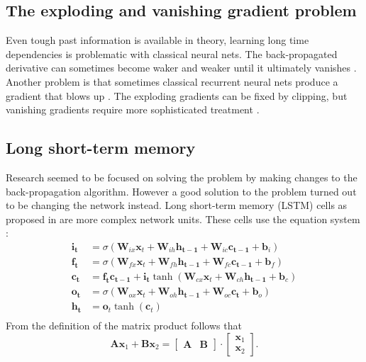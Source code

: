 \subsection{The exploding and vanishing gradient problem}
Even tough past information is available in theory, learning long time dependencies is problematic with classical neural nets. The back-propagated derivative can sometimes become waker and weaker until it ultimately vanishes \cite{Hochreiter1998}. Another problem is that sometimes classical recurrent neural nets produce a gradient that blows up \cite{Pascanu2012}. The exploding gradients can be fixed by clipping, but vanishing gradients require more sophisticated treatment \cite{Bengio1993}.     

\subsection{Long short-term memory}
Research seemed to be focused on solving the problem by making changes to the back-propagation algorithm. However a good solution to the problem turned out to
be changing the network instead. Long short-term memory (LSTM) cells as proposed in \cite{Hochreiter1995} are more complex network units.
These cells use the equation system \cite[page 5]{Graves2013}:
\begin{align}
\mathbf{i_t} &= \sigma (\mathbf{W}_{ix} \mathbf{x}_t + \mathbf{W}_{ih} \mathbf{h_{t-1}} + \mathbf{W}_{ic} \mathbf{c_{t-1}} +\mathbf{ b}_i) \\
\mathbf{f_t} &= \sigma (\mathbf{W}_{fx} \mathbf{x}_t + \mathbf{W}_{fh} \mathbf{h_{t-1}} + \mathbf{W}_{fc} \mathbf{c_{t-1}} +\mathbf{ b}_f) \\
\mathbf{c_t} &= \mathbf{f_t} \mathbf{c_{t-1}} + \mathbf{i_t} \tanh( \mathbf{W}_{cx} \mathbf{x}_t + \mathbf{W}_{ch} \mathbf{h_{t-1}} + \mathbf{b}_c ) \\
\mathbf{o_t} &= \sigma (\mathbf{W}_{ox} \mathbf{x}_t + \mathbf{W}_{oh} \mathbf{h_{t-1}} + \mathbf{W}_{oc} \mathbf{c_t} + \mathbf{b}_o ) \\
\mathbf{h_t} &= \mathbf{o}_t \tanh(\mathbf{c}_t) \\
\end{align}
From the definition of the matrix product follows that
\begin{equation}
\mathbf{A}\mathbf{x}_1 + \mathbf{B}\mathbf{x}_2
=
\begin{bmatrix} \mathbf{A} & \mathbf{B} \end{bmatrix} \cdot
\begin{bmatrix} \mathbf{x}_1 \\ \mathbf{x}_2 \end{bmatrix}.
\end{equation}
